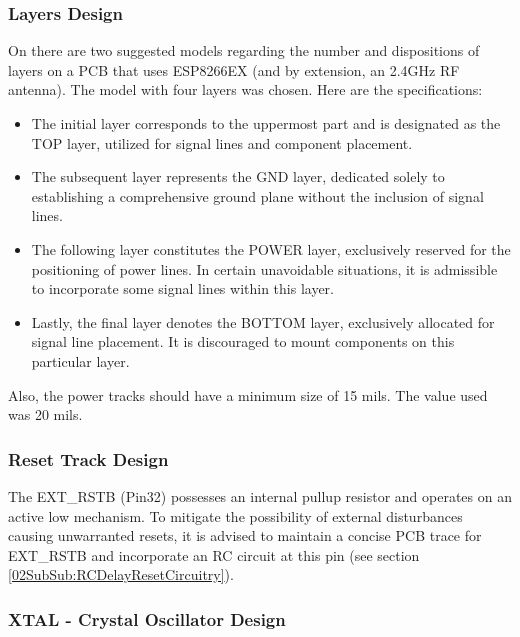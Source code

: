 \subsubsection{Layers Design}\label{02SubSub:LayersDesign}

On \cite{ESP8266HGL} there are two suggested models regarding the number and dispositions of layers on a PCB
that uses ESP8266EX (and by extension, an 2.4GHz RF antenna). The model with four layers was chosen. Here are 
the specifications: 


\begin{itemize}
    \item The initial layer corresponds to the uppermost part and is designated as the TOP layer, utilized for 
    signal lines and component placement.
    \item The subsequent layer represents the GND layer, dedicated solely to establishing a comprehensive ground plane without 
    the inclusion of signal lines.
    \item The following layer constitutes the POWER layer, exclusively reserved for the positioning of power lines. In certain 
    unavoidable situations, it is admissible to incorporate some signal lines within this layer.
    \item Lastly, the final layer denotes the BOTTOM layer, exclusively allocated for signal line placement. It is discouraged 
    to mount components on this particular layer.
\end{itemize}

Also, the power tracks should have a minimum size of 15 mils. The value used was 20 mils.

\subsubsection{Reset Track Design}\label{02SubSub:ResetTrackDesign}

The EXT\_RSTB (Pin32) possesses an internal pullup resistor and operates on an active low mechanism. To mitigate the possibility
of external disturbances causing unwarranted resets, it is advised to maintain a concise PCB trace for EXT\_RSTB and 
incorporate an RC circuit at this pin \cite{ESP8266HGL} (see section \ref{02SubSub:RCDelayResetCircuitry}).



\subsubsection{XTAL - Crystal Oscillator Design}

